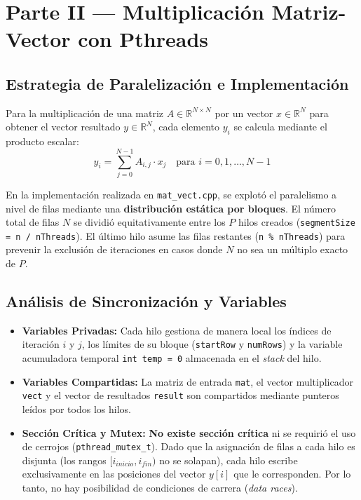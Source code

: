 \documentclass[11pt,a4paper]{article}
\begin{document}
\section{Parte II — Multiplicación Matriz-Vector con Pthreads}

\subsection{Estrategia de Paralelización e Implementación}
Para la multiplicación de una matriz $A \in \mathbb{R}^{N \times N}$ por un vector $x \in \mathbb{R}^N$ para obtener el vector resultado $y \in \mathbb{R}^N$, cada elemento $y_i$ se calcula mediante el producto escalar:
\begin{equation}
y_i = \sum_{j=0}^{N-1} A_{i,j} \cdot x_j \quad \text{para } i = 0, 1, \dots, N-1
\end{equation}

En la implementación realizada en \texttt{mat\_vect.cpp}, se explotó el paralelismo a nivel de filas mediante una \textbf{distribución estática por bloques}. El número total de filas $N$ se dividió equitativamente entre los $P$ hilos creados (\texttt{segmentSize = n / nThreads}). El último hilo asume las filas restantes (\texttt{n \% nThreads}) para prevenir la exclusión de iteraciones en casos donde $N$ no sea un múltiplo exacto de $P$.

\subsection{Análisis de Sincronización y Variables}
\begin{itemize}
    \item \textbf{Variables Privadas:} Cada hilo gestiona de manera local los índices de iteración $i$ y $j$, los límites de su bloque (\texttt{startRow} y \texttt{numRows}) y la variable acumuladora temporal \texttt{int temp = 0} almacenada en el \textit{stack} del hilo.
    \item \textbf{Variables Compartidas:} La matriz de entrada \texttt{mat}, el vector multiplicador \texttt{vect} y el vector de resultados \texttt{result} son compartidos mediante punteros leídos por todos los hilos.
    \item \textbf{Sección Crítica y Mutex:} \textbf{No existe sección crítica} ni se requirió el uso de cerrojos (\texttt{pthread\_mutex\_t}). Dado que la asignación de filas a cada hilo es disjunta (los rangos $[i_{inicio}, i_{fin})$ no se solapan), cada hilo escribe exclusivamente en las posiciones del vector $y[i]$ que le corresponden. Por lo tanto, no hay posibilidad de condiciones de carrera (\textit{data races}).
\end{itemize}
\end{document}
